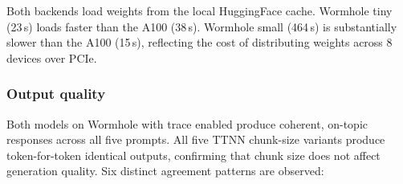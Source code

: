Both backends load weights from the local HuggingFace cache. Wormhole tiny (23\,s) loads faster than the A100 (38\,s). Wormhole small (464\,s) is substantially slower than the A100 (15\,s), reflecting the cost of distributing weights across 8 devices over PCIe.

\subsubsection{Output quality}
\label{sec:eval-quality}

Both models on Wormhole with trace enabled produce coherent, on-topic responses across all five prompts. All five TTNN chunk-size variants produce token-for-token identical outputs, confirming that chunk size does not affect generation quality. Six distinct agreement patterns are observed:

